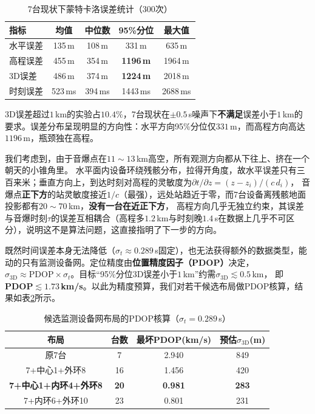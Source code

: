 \documentclass[draft,12pt,a4paper]{ctexart}
\theoremstyle{definition}
\begin{document}
\begin{table}[H]\centering
  \caption{7台现状下蒙特卡洛误差统计（300次）}\label{tab:q4-mc7}
  \small
  \begin{tabular}{lcccc}
    \toprule
    \textbf{指标} & \textbf{均值} & \textbf{中位数} & \textbf{95\%分位} & \textbf{最大值} \\
    \midrule
    水平误差 & 135\,m & 108\,m & 331\,m & 635\,m \\
    高程误差 & 455\,m & 354\,m & \textbf{1196\,m} & 1964\,m \\
    3D误差 & 486\,m & 374\,m & \textbf{1224\,m} & 2018\,m \\
    时刻误差 & 523\,ms & 394\,ms & 1443\,ms & 2688\,ms \\
    \bottomrule
  \end{tabular}
\end{table}

3D误差超过$1$\,km的实验占\textbf{$10.4\%$}，7台现状在$\pm0.5$\,s噪声下\textbf{不满足}误差小于$1$\,km的要求。误差分布呈现明显的方向性：水平方向95\%分位仅$331$\,m，而高程方向高达$1196$\,m，瓶颈独在高程。


我们考虑到，由于音爆点在$11\sim13$\,km高空，所有观测方向都从下往上、挤在一个朝天的小锥角里。
水平面内设备环绕残骸分布，拉得开角度，故水平误差只有三百来米；垂直方向上，到达时刻对高程的灵敏度为$\partial t/\partial z=(z-z_i)/(c\,d_i)$，
音爆点\textbf{正下方}的站灵敏度接近$1/c$（最强），远处站趋近于零，而7台设备离残骸地面投影都有$20\sim70$\,km，\textbf{没有一台在近正下方}，
高程方向几乎无独立约束，其误差与音爆时刻$\tau$的误差互相耦合（高程多$1.2$\,km与时刻晚$1.4$\,s在数据上几乎不可区分），说明这不是算法问题，这直接指明了下一步的方向。

既然时间误差本身无法降低（$\sigma_t\approx0.289$\,s固定），也无法获得额外的数据类型，能动的只有监测设备网。定位精度由\textbf{位置精度因子（PDOP）}决定，
$\sigma_{\mathrm{3D}}\approx\mathrm{PDOP}\times\sigma_t$。目标``95\%分位3D误差小于$1$\,km''约需$\sigma_{\mathrm{3D}}\lesssim0.5$\,km，
即\textbf{PDOP$\lesssim1.73$\,km/s}。以此为精度预算，我们对若干候选布局做PDOP核算，结果如表\ref{tab:q4-pdop}所示。

\begin{table}[H]\centering
  \caption{候选监测设备网布局的PDOP核算（$\sigma_t=0.289$\,s）}\label{tab:q4-pdop}
  \small
  \begin{tabular}{cccc}
    \toprule
    \textbf{布局} & \textbf{台数} & \textbf{最坏PDOP(km/s)} & \textbf{预估}$\sigma_{\text{3D}}$\textbf{(m)} \\
    \midrule
    原7台 & 7 & 2.940 & 849 \\
    7+中心1+外环8 & 16 & 1.456 & 420 \\
    \textbf{7+中心1+内环4+外环8} & \textbf{20} & \textbf{0.981} & \textbf{283} \\
    7+内环6+外环10 & 23 & 0.801 & 231 \\
    \bottomrule
  \end{tabular}
\end{table}
\end{document}
